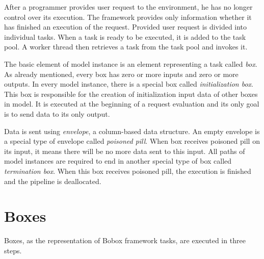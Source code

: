 After a programmer provides user request to the environment, he has no longer control over its execution. The framework provides only information whether it has finished an execution of the request. Provided user request is divided into individual tasks. When a task is ready to be executed, it is added to the task pool. A worker thread then retrieves a task from the task pool and invokes it.

The basic element of model instance is an element representing a task called \emph{box}.  As already mentioned, every box has zero or more inputs and zero or more outputs. In every model instance, there is a special box called \emph{initialization box}. This box is responsible for the creation of initialization input data of other boxes in model. It is executed at the beginning of a request evaluation and its only goal is to send data to its only output.

Data is sent using \emph{envelope}, a column-based data structure. An empty envelope is a special type of envelope called \emph{poisoned pill}. When box receives poisoned pill on its input, it means there will be no more data sent to this input. All paths of model instances are required to end in another special type of box called \emph{termination box}. When this box receives poisoned pill, the execution is finished and the pipeline is deallocated.

\section{Boxes}
Boxes, as the representation of Bobox framework tasks, are executed in three steps.

